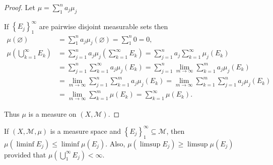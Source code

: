 \begin{proof}
    Let \( \mu = \sum_{1}^{n} a_{j}\mu_{j} \)

    If \( {\left\{E_{j}\right\}}_{1}^{\infty} \) are pairwise disjoint measurable sets then
    \begingroup
    \allowdisplaybreaks%
    \begin{align*}
        \mu(\varnothing)                              & = \sum_{1}^{n} a_{j}\mu_{j}(\varnothing) = \sum_{1}^{n} 0 = 0,                                                                                          \\
        \mu \left(\bigcup_{k=1}^{\infty} E_{k}\right) & = \sum_{j=1}^{n} a_{j}\mu_{j}\left( \sum_{k=1}^{\infty} E_{k} \right) = \sum_{j=1}^{n} a_{j}\sum_{k=1}^{\infty}\mu_{j}(E_{k})                           \\
                                                      & = \sum_{j=1}^{n}\sum_{k=1}^{\infty} a_{j}\mu_{j}(E_{k}) = \sum_{j=1}^{n} \lim\limits_{m \to \infty} \sum_{k=1}^{m} a_{j}\mu_{j}(E_{k})                  \\
                                                      & = \lim\limits_{m\to\infty} \sum_{j=1}^{n}\sum_{k=1}^{m} a_{j}\mu_{j}(E_{k}) = \lim\limits_{m\to\infty} \sum_{k=1}^{m}\sum_{j=1}^{n} a_{j}\mu_{j}(E_{k}) \\
                                                      & = \lim\limits_{m\to\infty} \sum_{k=1}^{m} \mu(E_{k}) = \sum_{k=1}^{\infty} \mu(E_{k}).
    \end{align*}
    \endgroup

    Thus \( \mu \) is a measure on \( (X, \mathcal{M}) \).
\end{proof}

\newpage

\begin{exercise}
    If \( (X, \mathcal{M}, \mu) \) is a measure space and \( {\left\{ E_{j} \right\}}_{1}^{\infty} \subseteq \mathcal{M} \), then \( \mu(\liminf E_{j}) \le \liminf \mu(E_{j}) \). Also, \( \mu(\limsup E_{j}) \ge \limsup \mu(E_{j}) \) provided that \( \mu\left( \bigcup_{1}^{\infty} E_{j} \right) < \infty \).
\end{exercise}

